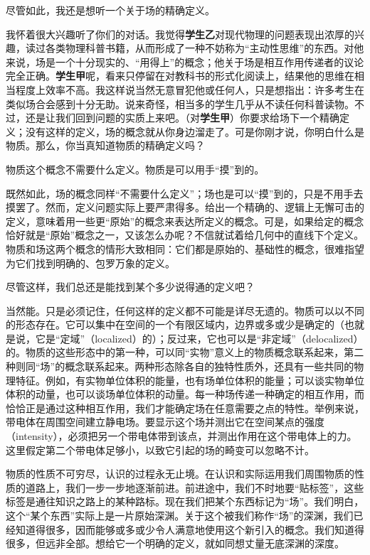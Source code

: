 \begin{dialogue}
\stda 尽管如此，我还是想听一个关于场的精确定义。

\tchr 我怀着很大兴趣听了你们的对话。我觉得\textbf{学生乙}对现代物理的问题表现出浓厚的兴趣，读过各类物理科普书籍，从而形成了一种不妨称为“主动性思维”的东西。对他来说，场是一个十分现实的、“用得上”的概念；他关于场是相互作用传递者的议论完全正确。\textbf{学生甲}呢，看来只停留在对教科书的形式化阅读上，结果他的思维在相当程度上效率不高。我这样说当然无意冒犯他或任何人，只是想指出：许多考生在类似场合会感到十分无助。说来奇怪，相当多的学生几乎从不读任何科普读物。不过，还是让我们回到问题的实质上来吧。（对\textbf{学生甲}）你要求给场下一个精确定义；没有这样的定义，场的概念就从你身边溜走了。可是你刚才说，你明白什么是物质。那么，你当真知道物质的精确定义吗？

\stda 物质这个概念不需要什么定义。物质是可以用手“摸”到的。

\tchr 既然如此，场的概念同样“不需要什么定义”；场也是可以“摸”到的，只是不用手去摸罢了。然而，定义问题实际上要严肃得多。给出一个精确的、逻辑上无懈可击的定义，意味着用一些更“原始”的概念来表达所定义的概念。可是，如果给定的概念恰好就是“原始”概念之一，又该怎么办呢？不信就试着给几何中的直线下个定义。物质和场这两个概念的情形大致相同：它们都是原始的、基础性的概念，很难指望为它们找到明确的、包罗万象的定义。

\stda 尽管这样，我们总还是能找到某个多少说得通的定义吧？

\tchr 当然能。只是必须记住，任何这样的定义都不可能是详尽无遗的。物质可以以不同的形态存在。它可以集中在空间的一个有限区域内，边界或多或少是确定的（也就是说，它是“定域”（localized）的）；反过来，它也可以是“非定域”（delocalized）的。物质的这些形态中的第一种，可以同“实物”意义上的物质概念联系起来，第二种则同“场”的概念联系起来。两种形态除各自的独特性质外，还具有一些共同的物理特征。例如，有实物单位体积的能量，也有场单位体积的能量；可以谈实物单位体积的动量，也可以谈场单位体积的动量。每一种场传递一种确定的相互作用，而恰恰正是通过这种相互作用，我们才能确定场在任意需要之点的特性。举例来说，带电体在周围空间建立静电场。要显示这个场并测出它在空间某点的强度（intensity），必须把另一个带电体带到该点，并测出作用在这个带电体上的力。这里假定第二个带电体足够小，以致它引起的场的畸变可以忽略不计。

物质的性质不可穷尽，认识的过程永无止境。在认识和实际运用我们周围物质的性质的道路上，我们一步一步地逐渐前进。前进途中，我们不时地要“贴标签”，这些标签是通往知识之路上的某种路标。现在我们把某个东西标记为“场”。我们明白，这个“某个东西”实际上是一片原始深渊。关于这个被我们称作“场”的深渊，我们已经知道得很多，因而能够或多或少令人满意地使用这个新引入的概念。我们知道得很多，但远非全部。想给它一个明确的定义，就如同想丈量无底深渊的深度。


\end{dialogue}
